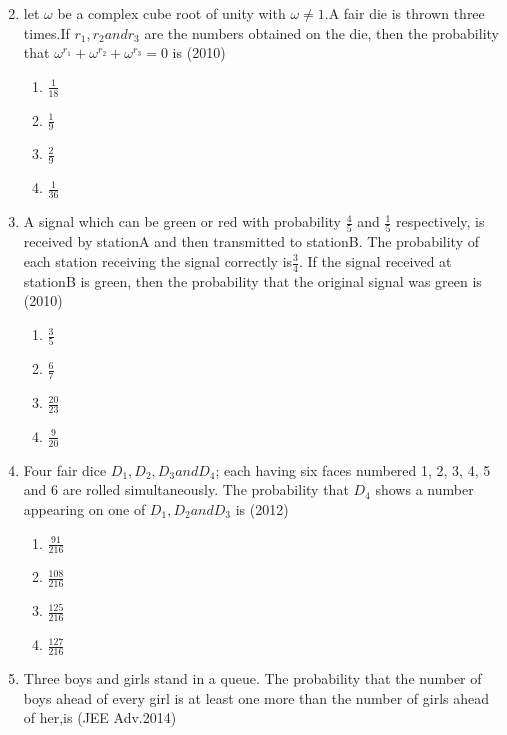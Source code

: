 \documentclass[journal,12pt,twocolumn]{IEEEtran}
\theoremstyle{remark}
\begin{document}
\begin{enumerate}[start=16]
\begin{multicols}{2}
\end{multicols}
\item let $\omega$ be a complex cube root of unity with $\omega\neq 1$.A fair die is thrown three times.If $r_{1},r_{2}and r_{3}$ are the numbers obtained on the die, then the probability that $\omega^{r_{1}}+\omega^{r_{2}}+\omega^{r_{3}}=0$ is \hfill (2010)
\begin{multicols}{4}
\begin{enumerate}
    \item $\frac{1}{18}$
    \item $\frac{1}{9}$
    \item $\frac{2}{9}$
    \item $\frac{1}{36}$
\end{enumerate}
\end{multicols}
\item A signal which can be green or red with probability $\frac{4}{5}$ and $\frac{1}{5}$ respectively, is received by stationA and then transmitted to stationB. The probability of each station receiving the signal correctly is$\frac{3}{4}$. If the signal received at stationB is green, then the probability that the original signal was green is \hfill (2010)
\begin{multicols}{4}
\begin{enumerate}
    \item $\frac{3}{5}$
    \item $\frac{6}{7}$
    \item $\frac{20}{23}$
    \item $\frac{9}{20}$
\end{enumerate}
\end{multicols}
\item Four fair dice $D_{1},D_{2},D_{3} and D_{4}$; each having six faces numbered 1, 2, 3, 4, 5 and 6 are rolled simultaneously.
The probability that $D_{4}$ shows a number appearing on one of $D_{1},D_{2}andD_{3}$ is \hfill (2012)
\begin{multicols}{4}
\begin{enumerate}
    \item $\frac{91}{216}$
    \item $\frac{108}{216}$
    \item $\frac{125}{216}$
    \item $\frac{127}{216}$
\end{enumerate}
\end{multicols}
\item Three boys and girls stand in a queue. The probability that the number of boys ahead of every girl is at least one more than the number of girls ahead of her,is \hfill (JEE Adv.2014)

\end{enumerate}
\end{document}
